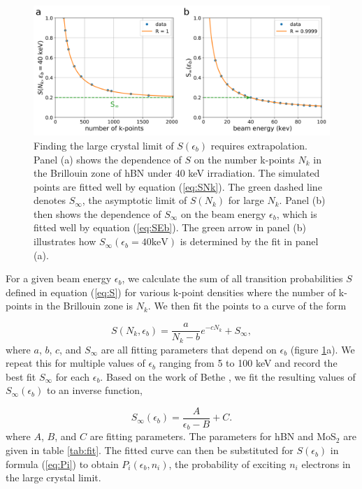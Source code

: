 \documentclass{article}
\begin{document}
\begin{figure}[H]
  \centering
  \includegraphics[width=\textwidth]{images/sum.pdf}
  \caption{
    Finding the large crystal limit of $S(\epsilon_b)$ requires extrapolation.
    Panel (a) shows the dependence of $S$ on the number k-points $N_k$ in the
    Brillouin zone of hBN under 40 keV irradiation.
    The simulated points are fitted well by equation (\ref{eq:SNk}).
    The green dashed line denotes $S_\infty$, the asymptotic limit of $S(N_k)$
    for large $N_k$.
    Panel (b) then shows the dependence of $S_\infty$ on the beam energy
    $\epsilon_b$, which is fitted well by equation (\ref{eq:SEb}).
    The green arrow in panel (b) illustrates how $S_\infty(\epsilon_b=40\text{
    keV})$ is determined by the fit in panel (a).
  }
  \label{fig:Sfit}
\end{figure}

For a given beam energy $\epsilon_b$, we calculate the sum of all transition
probabilities $S$ defined in equation (\ref{eq:S}) for various k-point
densities where the number of k-points in the Brillouin zone is $N_k$.
We then fit the points to a curve of the form

\begin{equation}
  S(N_k, \epsilon_b)
  =
  \frac{a}{N_k-b}e^{-cN_k} + S_\infty,
  \label{eq:SNk}
\end{equation}
%
where $a$, $b$, $c$, and $S_\infty$ are all fitting parameters that depend on
$\epsilon_b$ (figure \ref{fig:Sfit}a).
We repeat this for multiple values of $\epsilon_b$ ranging from 5 to 100 keV
and record the best fit
$S_\infty$ for each
$\epsilon_b$.
Based on the work of Bethe \cite{Bethe1930, Susi2019, Kretschmer2020}, we fit the resulting values of
$S_\infty(\epsilon_b)$ to an inverse function,

\begin{equation}
  S_\infty(\epsilon_b)
  =
  \frac{A}{\epsilon_b - B} + C.
  \label{eq:SEb}
\end{equation}
%
where $A$, $B$, and $C$ are fitting parameters.  The parameters for hBN and
MoS$_2$ are given in table \ref{tab:fit}.
The fitted curve can then be substituted for $S(\epsilon_b)$ in formula
(\ref{eq:Pi}) to obtain $P_i(\epsilon_b, n_i)$, the probability of exciting
$n_i$ electrons in the large crystal limit.
\end{document}
